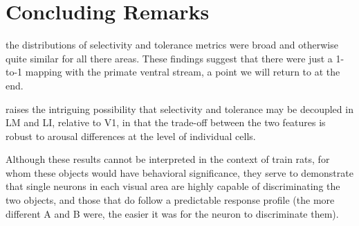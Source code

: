 \section{Concluding Remarks}

the distributions of selectivity and tolerance metrics were broad and otherwise quite similar for all there areas. 
These findings suggest that there  were just a 1-to-1 mapping with the primate ventral stream, a point we will return to at the end.



raises the intriguing possibility that selectivity and tolerance may be decoupled in LM and LI, relative to V1, in that the trade-off between the two features is robust to arousal differences at the level of individual cells. 



Although these results cannot be interpreted in the context of train rats, for whom these objects would have behavioral significance, they serve to demonstrate that single neurons in each visual area are highly capable of discriminating the two objects, and those that do follow a predictable response profile (the more different A and B were, the easier it was for the neuron to discriminate them).  